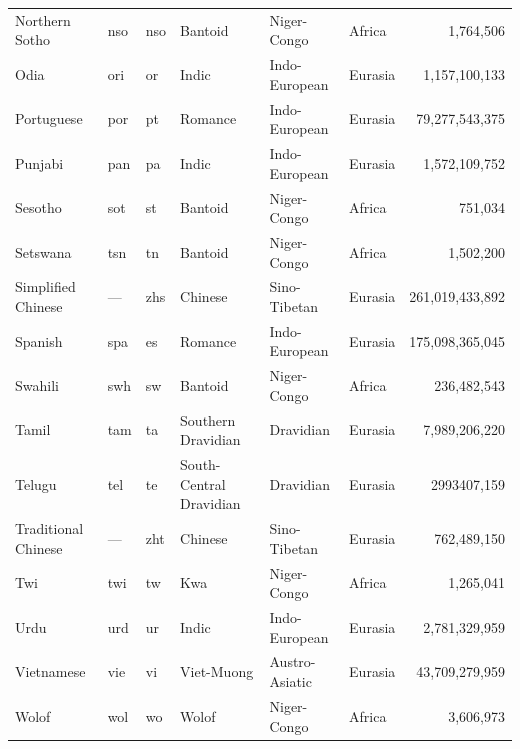 \documentclass[twoside,11pt]{article}
\begin{document}
\begin{table}[]
{\begin{tabular}{lTTlllr}
Northern Sotho      & nso       & nso         & Bantoid                 & Niger-Congo    & Africa    & 1,764,506       \\
Odia                & ori       & or          & Indic                   & Indo-European  & Eurasia   & 1,157,100,133    \\
Portuguese          & por       & pt          & Romance                 & Indo-European  & Eurasia   & 79,277,543,375   \\
Punjabi             & pan       & pa          & Indic                   & Indo-European  & Eurasia   & 1,572,109,752    \\
Sesotho             & sot       & st          & Bantoid                 & Niger-Congo    & Africa    & 751,034        \\
Setswana            & tsn       & tn          & Bantoid                 & Niger-Congo    & Africa    & 1,502,200       \\
Simplified Chinese  &     ---      & zhs         & Chinese                 & Sino-Tibetan   & Eurasia   & 261,019,433,892  \\
Spanish             & spa       & es          & Romance                 & Indo-European  & Eurasia   & 175,098,365,045  \\
Swahili             & swh       & sw          & Bantoid                 & Niger-Congo    & Africa    & 236,482,543     \\
Tamil               & tam       & ta          & Southern Dravidian      & Dravidian      & Eurasia   & 7,989,206,220    \\
Telugu              & tel       & te          & South-Central Dravidian & Dravidian      & Eurasia   & 2993407,159    \\
Traditional Chinese &      ---     & zht         & Chinese                 & Sino-Tibetan   & Eurasia   & 762,489,150     \\
Twi                 & twi       & tw          & Kwa                     & Niger-Congo    & Africa    & 1,265,041       \\
Urdu                & urd       & ur          & Indic                   & Indo-European  & Eurasia   & 2,781,329,959    \\
Vietnamese          & vie       & vi          & Viet-Muong              & Austro-Asiatic & Eurasia   & 43,709,279,959   \\
Wolof               & wol       & wo          & Wolof                   & Niger-Congo    & Africa    & 3,606,973       \\


\end{tabular}}
\end{table}
\end{document}
